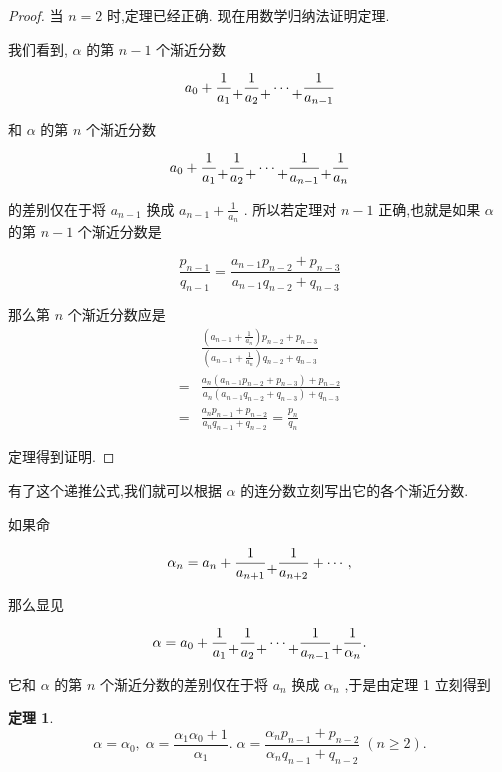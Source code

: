 \documentclass{ctexart}
\newcommand{\cplus}{\raisebox{-1ex}{+}}
\newtheorem{theorem}{\indent 定理}[section]
\begin{document}
\begin{proof}
  当 \(n = 2\) 时,定理已经正确. 现在用数学归纳法证明定理.

我们看到, \(\alpha\) 的第 \(n - 1\) 个渐近分数

\[
{a}_{0} + \frac{1}{{a}_{1}} \cplus \frac{1}{{a}_{2}} \cplus \cdots \cplus \frac{1}{{a}_{n - 1}}
\]

和 \(\alpha\) 的第 \(n\) 个渐近分数

\[
{a}_{0} + \frac{1}{{a}_{1}} \cplus \frac{1}{{a}_{2}} \cplus \cdots \cplus \frac{1}{{a}_{n - 1}} \cplus \frac{1}{{a}_{n}}
\]

的差别仅在于将 \({a}_{n - 1}\) 换成 \({a}_{n - 1} + \frac{1}{{a}_{n}}\) . 所以若定理对 \(n - 1\) 正确,也就是如果 \(\alpha\) 的第 \(n - 1\) 个渐近分数是

\[
\frac{{p}_{n - 1}}{{q}_{n - 1}} = \frac{{a}_{n - 1}{p}_{n - 2} + {p}_{n - 3}}{{a}_{n - 1}{q}_{n - 2} + {q}_{n - 3}}
\]

那么第 \(n\) 个渐近分数应是
\begin{align*}
  &\frac{\left( {{a}_{n - 1} + \frac{1}{{a}_{n}}}\right) {p}_{n - 2} + {p}_{n - 3}}{\left( {{a}_{n - 1} + \frac{1}{{a}_{n}}}\right) {q}_{n - 2} + {q}_{n - 3}} \\
  = & \frac{{a}_{n}\left( {{a}_{n - 1}{p}_{n - 2} + {p}_{n - 3}}\right) + {p}_{n - 2}}{{a}_{n}\left( {{a}_{n - 1}{q}_{n - 2} + {q}_{n - 3}}\right) + {q}_{n - 3}}\\
= & \frac{{a}_{n}{p}_{n - 1} + {p}_{n - 2}}{{a}_{n}{q}_{n - 1} + {q}_{n - 2}} = \frac{{p}_{n}}{{q}_{n}}
\end{align*}


定理得到证明.
\end{proof}


有了这个递推公式,我们就可以根据 \(\alpha\) 的连分数立刻写出它的各个渐近分数.

如果命

\[
{\alpha}_{n} = {a}_{n} + \frac{1}{{a}_{n + 1}} \cplus \frac{1}{{a}_{n + 2}} + \cdots ,
\]

那么显见

\[
\alpha = {a}_{0} + \frac{1}{{a}_{1}} \cplus \frac{1}{{a}_{2}} \cplus \cdots \cplus \frac{1}{{a}_{n - 1}} \cplus \frac{1}{{\alpha}_{n}}.
\]

它和 \(\alpha\) 的第 \(n\) 个渐近分数的差别仅在于将 \({a}_{n}\) 换成 \({\alpha }_{n}\) ,于是由定理 1 立刻得到

\begin{theorem}
  \label{thm:2}
\[
\alpha = {\alpha }_{0},\;\alpha = \frac{{\alpha }_{1}{\alpha }_{0} + 1}{{\alpha }_{1}}.\;\alpha = \frac{{\alpha }_{n}{p}_{n - 1} + {p}_{n - 2}}{{\alpha }_{n}{q}_{n - 1} + {q}_{n - 2}}\;\left( {n \geq 2}\right) .
\]
\end{theorem}
\end{document}
